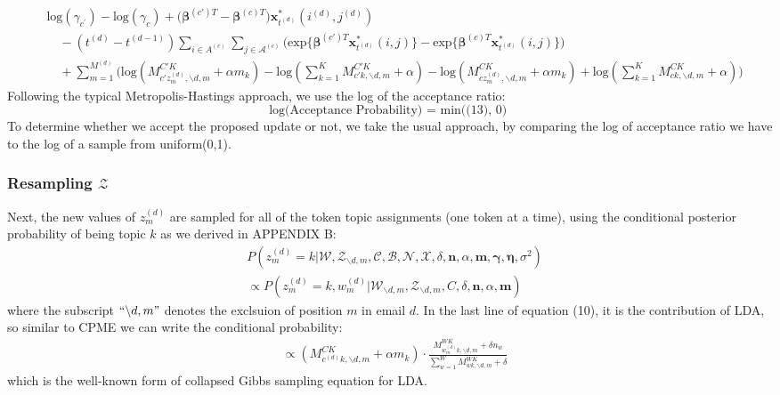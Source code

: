 \documentclass[a4paper]{article}
\begin{document}
  	   	 \begin{equation}
  	   	 \begin{aligned} &\mbox{log}(\gamma_{c^\prime})-\mbox{log}(\gamma_{c}) +\Big(\boldsymbol{\beta}^{(c')T}-\boldsymbol{\beta}^{(c)T}\Big)\boldsymbol{x}^*_{t^{(d)}}(i^{(d)}, j^{(d)})\\& \quad-(t^{(d)}-t^{(d-1)})\sum\limits_{i \in A^{(c)}}\sum\limits_{j\in \mathcal{A}^{(c)}}\Big(\mbox{exp}\Big\{\boldsymbol{\beta}^{(c')T}\boldsymbol{x}^*_{t^{(d)}}(i, j)\Big\}-\mbox{exp}\Big\{\boldsymbol{\beta}^{(c)T}\boldsymbol{x}^*_{t^{(d)}}(i, j)\Big\}\Big)\\&\quad+\sum_{m=1}^{M^{(d)}}\Big(\mbox{log}({M^{C'K}_{c'z_m^{(d)}, \backslash d, m}+\alpha m_k})-\mbox{log}({\sum_{k=1}^KM^{C'K}_{c'k, \backslash d, m}+\alpha})-\mbox{log}({M^{CK}_{cz_m^{(d)}, \backslash d, m}+\alpha m_k})+\mbox{log}({\sum_{k=1}^KM^{CK}_{ck, \backslash d, m}+\alpha})\Big)
  	 \end{aligned}
  	 \end{equation}
 Following the typical Metropolis-Hastings approach, we use the log of the acceptance ratio:
  	 \begin{equation}
  	 \mbox{log(Acceptance Probability) = min((13), 0) }
  	 \end{equation}
  	 To determine whether we accept the proposed update or not, we take the usual approach, by comparing the log of acceptance ratio we have to the log of a sample from uniform(0,1).
\subsubsection{Resampling $\mathcal{Z}$}
Next, the new values of $z^{(d)}_m$ are sampled for all of the token topic assignments (one token at a time), using the conditional posterior probability of being topic $k$ as we derived in APPENDIX B:
\begin{equation}
\begin{aligned} & 
 P(z^{(d)}_m=k|\mathcal{W}, \mathcal{Z}_{\backslash d, m},  \mathcal{C}, \mathcal{B}, \mathcal{N}, \mathcal{X}, \delta, \boldsymbol{n}, \alpha, \boldsymbol{m}, \boldsymbol{\gamma}, \boldsymbol{\eta}, \sigma^2)\\
& \propto P(z^{(d)}_m=k, w^{(d)}_m|\mathcal{W}_{\backslash d, m}, \mathcal{Z}_{\backslash d,m}, C, \delta, \boldsymbol{n}, \alpha, \boldsymbol{m})
\end{aligned}
\end{equation}
where the subscript $``{\backslash d, m}"$ denotes the exclsuion of position $m$ in email $d$. In the last line of equation (10), it is the contribution of LDA, so similar to CPME we can write the conditional probability:
	\begin{equation}
	\begin{aligned} 
	& \propto(M^{CK}_{c^{(d)}k, \backslash d, m}+\alpha m_k)\cdot\frac{M_{w_m^{(d)}k, \backslash d, m}^{WK}+\delta n_w}{\sum_{w=1}^WM_{wk,  \backslash d, m}^{WK}+\delta}
	\end{aligned}
	\end{equation}
	which is the well-known form of collapsed Gibbs sampling equation for LDA.
\end{document}
